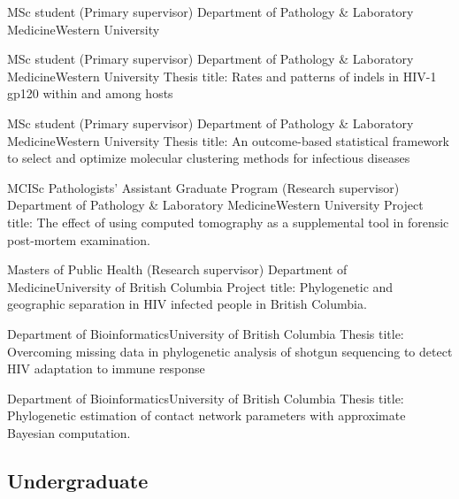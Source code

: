 {MSc student (Primary supervisor)}
{Department of Pathology \& Laboratory Medicine}{Western University}
{}

{MSc student (Primary supervisor)}
{Department of Pathology \& Laboratory Medicine}{Western University}
{Thesis title: Rates and patterns of indels in HIV-1 gp120 within and among hosts}

{MSc student (Primary supervisor)}
{Department of Pathology \& Laboratory Medicine}{Western University}
{Thesis title: An outcome-based statistical framework to select and optimize molecular clustering methods for infectious diseases}

{MCISc Pathologists' Assistant Graduate Program (Research supervisor)}
{Department of Pathology \& Laboratory Medicine}{Western University}
{Project title: The effect of using computed tomography as a supplemental tool in forensic post-mortem examination.}

{Masters of Public Health (Research supervisor)}
{Department of Medicine}{University of British Columbia}
{Project title: Phylogenetic and geographic separation in HIV infected people in British Columbia.}

{Department of Bioinformatics}{University of British Columbia}
{Thesis title: Overcoming missing data in phylogenetic analysis of shotgun sequencing to detect HIV adaptation to immune response}

{Department of Bioinformatics}{University of British Columbia}
{Thesis title: Phylogenetic estimation of contact network parameters with approximate Bayesian computation.}


\subsection {Undergraduate}



